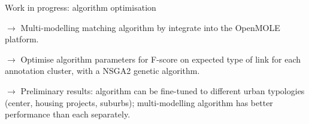 \documentclass{beamer}
\begin{document}
\begin{frame}{Work in progress: algorithm optimisation}


$\rightarrow$ Multi-modelling matching algorithm by \cite{guardiola2024optimising} integrate into the OpenMOLE platform.

\medskip

$\rightarrow$ Optimise algorithm parameters for F-score on expected type of link for each annotation cluster, with a NSGA2 genetic algorithm.

\medskip

$\rightarrow$ Preliminary results: algorithm can be fine-tuned to different urban typologies (center, housing projects, suburbs); multi-modelling algorithm has better performance than each separately.

\end{frame}
\end{document}
